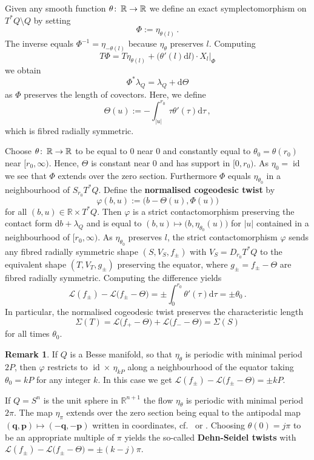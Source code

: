\documentclass{amsart}
\theoremstyle{definition}
\newtheorem{rem}[prop]{Remark}
\def\co{\colon\thinspace}
\newcommand{\rmd}{\mathrm d}
\newcommand{\LLL}{\mathscr L}
\newcommand{\bfp}{\mathbf p}
\newcommand{\bfq}{\mathbf q}
\newcommand{\R}{\mathbb R}
\newcommand{\ra}{\rightarrow}
\DeclareMathOperator{\id}{\mathrm{id}}
\begin{document}
  Given any smooth function $\theta\co\R\ra\R$
  we define an exact symplectomorphism
  on $T^*Q\setminus Q$
  by setting
  \[
  \Phi:=\eta_{\theta(l)}
  \,.
  \]
  The inverse equals
  $\Phi^{-1}=\eta_{-\theta(l)}$
  because $\eta_{\theta}$ preserves $l$.
  Computing
  \[
  T\Phi=
  T\eta_{\theta(l)}+
  \big(\theta'(l)\rmd l\big)\cdot X_l|_{\Phi}
  \]
  we obtain
  \[
  \Phi^*\lambda_Q=
  \lambda_Q+\rmd\Theta
  \]
  as $\Phi$ preserves the length of covectors.
  Here, we define
  \[
  \Theta(u):=
  -\int_{|u|}^{r_0}\tau\theta'(\tau)\rmd\tau
  \,,
  \]
  which is fibred radially symmetric.
  
  Choose $\theta\co\R\ra\R$ to be equal to $0$ near $0$
  and constantly equal to $\theta_0=\theta(r_0)$
  near $[r_0,\infty)$.
  Hence,
  $\Theta$ is constant near $0$
  and has support in $[0,r_0)$.
  As $\eta_0=\id$ we see that $\Phi$
  extends over the zero section.
  Furthermore
  $\Phi$ equals $\eta_{\theta_0}$
  in a neighbourhood of $S_{r_0}T^*Q$.
  Define the
  {\bf normalised cogeodesic twist}
  by
  \[
  \varphi(b,u):=\big(b-\Theta(u),\Phi(u)\big)
  \]
  for all $(b,u)\in\R\times T^*Q$.
  Then $\varphi$ is a strict contactomorphism
  preserving the contact form $\rmd b+\lambda_Q$
  and is equal to
  $(b,u)\mapsto\big(b,\eta_{\theta_0}(u)\big)$
  for $|u|$ contained in a neighbourhood of $[r_0,\infty)$.
  As $\eta_{\theta_0}$ preserves $l$,
  the strict contactomorphism $\varphi$
  sends any fibred radially symmetric shape
  $(S,V_S,f_{\pm})$ with $V_S=D_{r_0}T^*Q$
  to the equivalent shape $(T,V_T,g_{\pm})$
  preserving the equator,
  where $g_{\pm}=f_{\pm}-\Theta$
  are fibred radially symmetric.
  Computing the difference yields
  \[
  \LLL(f_{\pm})-\LLL\big(f_{\pm}-\Theta\big)
  =\pm\int_0^{r_0}\theta'(\tau)\rmd\tau
  =\pm\theta_0
  \,.
  \]
In particular,
the normalised cogeodesic twist
preserves the characteristic length
\[
\Sigma(T)=
\LLL\big(f_+-\Theta\big)+
\LLL\big(f_--\Theta\big)=
\Sigma(S)
\]
for all times $\theta_0$.


\begin{rem}
\label{rem:bessetwist}
  If $Q$ is a Besse manifold,
  so that $\eta_{\theta}$ is periodic
  with minimal period $2P$,
  then $\varphi$ restricts to
  $\id\times\,\eta_{kP}$ along a neighbourhood
  of the equator taking $\theta_0=kP$
  for any integer $k$.
  In this case we get
  $\LLL(f_{\pm})-\LLL\big(f_{\pm}-\Theta\big)=\pm kP$.
  
  If $Q=S^n$ is the unit sphere in $\R^{n+1}$
  the flow $\eta_{\theta}$ is periodic
  with minimal period $2\pi$.
  The map $\eta_{\pi}$
  extends over the zero section
  being equal to the antipodal map
  $(\bfq,\bfp)\mapsto(-\bfq,-\bfp)$
  written in coordinates,
  cf.\ \cite[Section 4]{bgz19} or \cite[Section 2.2]{vkn05}.
  Choosing $\theta(0)=j\pi$ to be an appropriate
  multiple of $\pi$ yields the so-called
  {\bf Dehn-Seidel twists} with
  $\LLL(f_{\pm})-\LLL\big(f_{\pm}-\Theta\big)=\pm(k-j)\pi$.
\end{rem}
\end{document}
